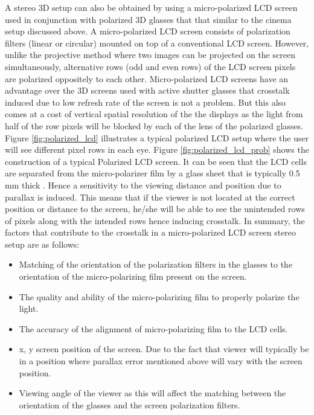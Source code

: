 A stereo 3D setup can also be obtained by using a micro-polarized LCD screen used in conjunction with polarized 3D glasses that that similar to the cinema setup discussed above. A micro-polarized LCD screen consists of polarization filters (linear or circular) mounted on top of a conventional LCD screen. However, unlike the projective method where two images can be projected on the screen simultaneously, alternative rows (odd and even rows) of the LCD screen pixels are polarized oppositely to each other. Micro-polarized LCD screens have an advantage over the 3D screens used with active shutter glasses that crosstalk induced due to low refresh rate of the screen is not a problem. But this also comes at a cost of vertical spatial resolution of the the displays as the light from half of the row pixels will be blocked by each of the lens of the polarized glasses. Figure \ref{fig:polarized_lcd} illustrates a typical polarized LCD setup where the user will see different pixel rows in each eye. Figure \ref{fig:polarized_lcd_prob} shows the construction of a typical Polarized LCD screen. It can be seen that the LCD cells are separated from the micro-polarizer film by a glass sheet that is typically 0.5 mm thick \cite{woods2012crosstalk}. Hence a sensitivity to the viewing distance and position due to parallax is induced. This means that if the viewer is not located at the correct position or distance to the screen, he/she will be able to see the unintended rows of pixels along with the intended rows hence inducing crosstalk. In summary, the factors that contribute to the crosstalk in a micro-polarized LCD screen stereo setup are as follows:
\begin{itemize}
\item{Matching of the orientation of the polarization filters in the glasses to the orientation of the micro-polarizing film present on the screen.}
\item{The quality and ability of the micro-polarizing film to properly polarize the light.}
\item{The accuracy of the alignment of micro-polarizing film to the LCD cells.}
\item{x, y screen position of the screen. Due to the fact that viewer will typically be in a position where parallax error mentioned above will vary with the screen position.}
\item{Viewing angle of the viewer as this will affect the matching between the orientation of the glasses and the screen polarization filters.}
\end{itemize}

